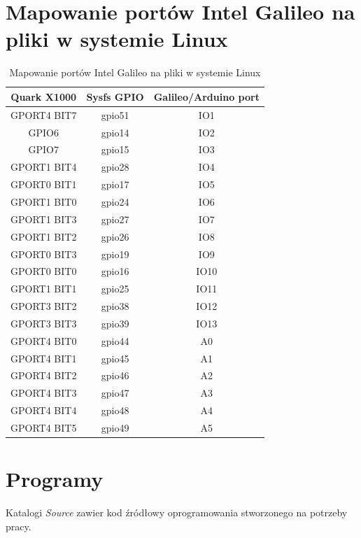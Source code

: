\documentclass{xmgr}
\begin{document}
\chapter{Mapowanie portów Intel Galileo na pliki w systemie Linux}
\begin{table}[!hp]
\begin{tabular}{|c|c|c|} \hline
\textbf{Quark X1000} & \textbf{Sysfs GPIO} & \textbf{Galileo/Arduino port} \\ \hline
GPORT4 BIT7 & gpio51 & IO1 \\ \hline
GPIO6 & gpio14 & IO2 \\ \hline
GPIO7 & gpio15 & IO3 \\ \hline
GPORT1 BIT4 & gpio28 & IO4 \\ \hline
GPORT0 BIT1 & gpio17 & IO5 \\ \hline
GPORT1 BIT0 & gpio24 & IO6 \\ \hline
GPORT1 BIT3 & gpio27 & IO7 \\ \hline
GPORT1 BIT2 & gpio26 & IO8 \\ \hline
GPORT0 BIT3 & gpio19 & IO9 \\ \hline
GPORT0 BIT0 & gpio16 & IO10 \\ \hline
GPORT1 BIT1 & gpio25 & IO11 \\ \hline
GPORT3 BIT2 & gpio38 & IO12 \\ \hline
GPORT3 BIT3 & gpio39 & IO13 \\ \hline
GPORT4 BIT0 & gpio44 & A0 \\ \hline
GPORT4 BIT1 & gpio45 & A1 \\ \hline
GPORT4 BIT2 & gpio46 & A2 \\ \hline
GPORT4 BIT3 & gpio47 & A3 \\ \hline
GPORT4 BIT4 & gpio48 & A4 \\ \hline
GPORT4 BIT5 & gpio49 & A5 \\ \hline
\end{tabular}
\caption{Mapowanie portów Intel Galileo na pliki w systemie Linux}
\end{table}

\chapter{Programy}
Katalogi \emph{Source} zawier kod źródłowy oprogramowania stworzonego na potrzeby pracy. 




\listoftables

\listoffigures

\oswiadczenie
\end{document}

